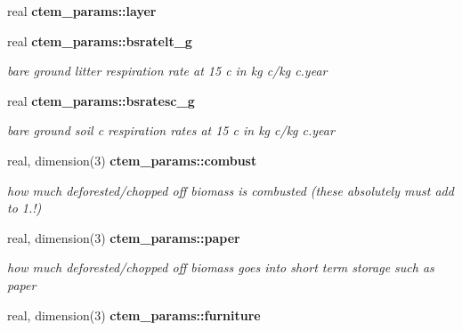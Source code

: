 \begin{DoxyCompactItemize}
\item 
\hypertarget{namespacectem__params_a87ca149678d1b30552a94526aa493f23}{}real {\bfseries ctem\+\_\+params\+::layer}\label{namespacectem__params_a87ca149678d1b30552a94526aa493f23}

\item 
\hypertarget{namespacectem__params_af429d00148e673d58d18e9d3a419ee66}{}real {\bfseries ctem\+\_\+params\+::bsratelt\+\_\+g}\label{namespacectem__params_af429d00148e673d58d18e9d3a419ee66}

\begin{DoxyCompactList}\small\item\em bare ground litter respiration rate at 15 c in kg c/kg c.\+year \end{DoxyCompactList}\item 
\hypertarget{namespacectem__params_a3b130e3b7506998094c8650ea4d26ff7}{}real {\bfseries ctem\+\_\+params\+::bsratesc\+\_\+g}\label{namespacectem__params_a3b130e3b7506998094c8650ea4d26ff7}

\begin{DoxyCompactList}\small\item\em bare ground soil c respiration rates at 15 c in kg c/kg c.\+year \end{DoxyCompactList}\item 
\hypertarget{namespacectem__params_aa754be19830b01b24a5a992122c67f6f}{}real, dimension(3) {\bfseries ctem\+\_\+params\+::combust}\label{namespacectem__params_aa754be19830b01b24a5a992122c67f6f}

\begin{DoxyCompactList}\small\item\em how much deforested/chopped off biomass is combusted (these absolutely must add to 1.!) \end{DoxyCompactList}\item 
\hypertarget{namespacectem__params_a39b15413313f38228e1c02dbd0d672f3}{}real, dimension(3) {\bfseries ctem\+\_\+params\+::paper}\label{namespacectem__params_a39b15413313f38228e1c02dbd0d672f3}

\begin{DoxyCompactList}\small\item\em how much deforested/chopped off biomass goes into short term storage such as paper \end{DoxyCompactList}\item 
\hypertarget{namespacectem__params_afde8cda60ab64e6f3699c990584b5aaf}{}real, dimension(3) {\bfseries ctem\+\_\+params\+::furniture}\label{namespacectem__params_afde8cda60ab64e6f3699c990584b5aaf}


\end{DoxyCompactItemize}

